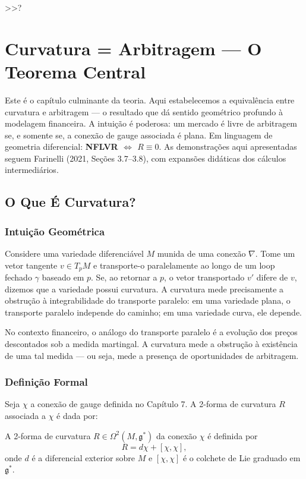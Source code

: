  >>?\chapter{Curvatura = Arbitragem --- O Teorema Central}

Este \'e o cap\'itulo culminante da teoria. Aqui estabelecemos a equival\^encia entre curvatura e arbitragem --- o resultado que d\'a sentido geom\'etrico profundo \`a modelagem financeira. A intui\c{c}\~ao \'e poderosa: um mercado \'e livre de arbitragem se, e somente se, a conex\~ao de gauge associada \'e plana. Em linguagem de geometria diferencial: \textbf{NFLVR $\Longleftrightarrow$ $R \equiv 0$}. As demonstra\c{c}\~oes aqui apresentadas seguem Farinelli (2021, Se\c{c}\~oes 3.7--3.8), com expans\~oes did\'aticas dos c\'alculos intermedi\'arios.

\section{O Que \'E Curvatura?}

\subsection{Intui\c{c}\~ao Geom\'etrica}

Considere uma variedade diferenci\'avel $M$ munida de uma conex\~ao $\nabla$. Tome um vetor tangente $v \in T_pM$ e transporte-o paralelamente ao longo de um loop fechado $\gamma$ baseado em $p$. Se, ao retornar a $p$, o vetor transportado $v'$ difere de $v$, dizemos que a variedade possui curvatura. A curvatura mede precisamente a obstru\c{c}\~ao \`a integrabilidade do transporte paralelo: em uma variedade plana, o transporte paralelo independe do caminho; em uma variedade curva, ele depende.

No contexto financeiro, o an\'alogo do transporte paralelo \'e a evolu\c{c}\~ao dos pre\c{c}os descontados sob a medida martingal. A curvatura mede a obstru\c{c}\~ao \`a exist\^encia de uma tal medida --- ou seja, mede a presen\c{c}a de oportunidades de arbitragem.

\subsection{Defini\c{c}\~ao Formal}

Seja $\chi$ a conex\~ao de gauge definida no Cap\'itulo 7. A 2-forma de curvatura $R$ associada a $\chi$ \'e dada por:

\begin{defi}
A 2-forma de curvatura $R \in \Omega^2(M, \mathfrak{g}^*)$ da conex\~ao $\chi$ \'e definida por
\begin{equation}
R = d\chi + [\chi, \chi],
\end{equation}
onde $d$ \'e a diferencial exterior sobre $M$ e $[\chi, \chi]$ \'e o colchete de Lie graduado em $\mathfrak{g}^*$.
\end{defi}

